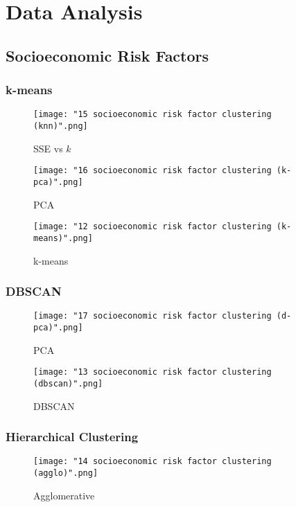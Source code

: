 \documentclass{article}
\begin{document}
	\section{Data Analysis}
		\label{futurework}
		\subsection{Socioeconomic Risk Factors}
			\subsubsection{k-means}
				\begin{figure}[h]
					\centering
					\caption{SSE vs $k$}
					\texttt{[image: "15 socioeconomic risk factor clustering (knn)".png]}
					\label{fig:socioKnn}
				\end{figure}
				\begin{figure}[h]
					\centering
					\caption{PCA}
					\texttt{[image: "16 socioeconomic risk factor clustering (k-pca)".png]}
					\label{fig:socioKpca}
				\end{figure}
				\begin{figure}[h]
					\centering
					\caption{k-means}
					\texttt{[image: "12 socioeconomic risk factor clustering (k-means)".png]}
					\label{fig:socioKmeans}
				\end{figure}
			\subsubsection{DBSCAN}
				\begin{figure}[h]
					\centering
					\caption{PCA}
					\texttt{[image: "17 socioeconomic risk factor clustering (d-pca)".png]}
					\label{fig:socioDpca}
				\end{figure}
				\begin{figure}[h]
					\centering
					\caption{DBSCAN}
					\texttt{[image: "13 socioeconomic risk factor clustering (dbscan)".png]}
					\label{fig:socioDbscan}
				\end{figure}
			\subsubsection{Hierarchical Clustering}
				\begin{figure}[h]
					\centering
					\caption{Agglomerative}
					\texttt{[image: "14 socioeconomic risk factor clustering (agglo)".png]}
					\label{fig:socioAgglo}
				\end{figure}
\end{document}
